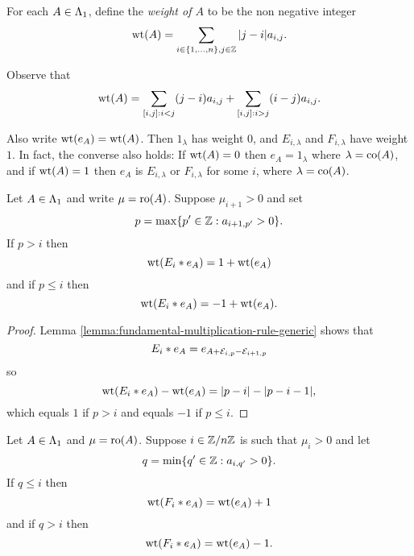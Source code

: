 \documentclass[a4paper, 11pt, twoside]{report}
\begin{document}
\begin{definition}\label{def:weight-of-matrix}
For each $A\in\Lambda_1{}$, define the \emph{weight of $A$} to be the non negative integer
\begin{equation*}
\operatorname{wt}(A) = \sum_{i\in\{1,\ldots,n\},j\in\mathbb{Z}} |j-i| a_{i,j}.
\end{equation*}
\end{definition}

Observe that
\begin{equation*}
\operatorname{wt}(A) = \sum_{[i,j]:i<j}(j-i)a_{i,j} + \sum_{[i,j]:i>j}(i-j)a_{i,j}.
\end{equation*}

Also write $\operatorname{wt}(e_A) = \operatorname{wt}(A)$. Then $1_\lambda$ has weight $0$, and $E_{i,\lambda}$ and $F_{i,\lambda}$ have weight $1$. In fact, the converse also holds: If $\operatorname{wt}(A)=0$ then $e_A=1_\lambda$ where $\lambda=\operatorname{co}(A)$, and if $\operatorname{wt}(A)=1$ then $e_A$ is $E_{i,\lambda}$ or $F_{i,\lambda}$ for some $i$, where $\lambda=\operatorname{co}(A)$.

\begin{lemma}\label{lemma:weight-change-E}
Let $A\in\Lambda_1{}$ and write $\mu=\operatorname{ro}(A)$. Suppose $\mu_{i+1}>0$ and set
\begin{equation*}
p=\max\{p'\in\mathbb{Z}: a_{i+1,p'}>0\}.
\end{equation*}
If $p>i$ then
\begin{equation*}
\operatorname{wt}(E_i\ast e_A)=1+\operatorname{wt}(e_A)
\end{equation*}
and if $p\le i$ then
\begin{equation*}
\operatorname{wt}(E_i\ast e_A)=-1+\operatorname{wt}(e_A).
\end{equation*}
\end{lemma}

\begin{proof}
Lemma \ref{lemma:fundamental-multiplication-rule-generic} shows that
\begin{equation*}
E_i\ast e_A = e_{A+\mathcal{E}_{i,p}-\mathcal{E}_{i+1,p}}
\end{equation*}
so
\begin{equation*}
\operatorname{wt}(E_i\ast e_A) - \operatorname{wt}(e_A) = |p-i| - |p-i-1|,
\end{equation*}
which equals $1$ if $p>i$ and equals $-1$ if $p\le i$.
\end{proof}

\begin{lemma}\label{lemma:weight-change-F}
Let $A\in\Lambda_1{}$ and $\mu=\operatorname{ro}(A)$. Suppose $i\in\mathbb{Z}/{n \mathbb{Z}}$ is such that $\mu_i>0$ and let
\begin{equation*}
q = \min\{q'\in\mathbb{Z}:a_{i,q'}>0\}.
\end{equation*}
If $q\le i$ then
\begin{equation*}
\operatorname{wt}(F_i\ast e_A) = \operatorname{wt}(e_A) + 1
\end{equation*}
and if $q>i$ then
\begin{equation*}
\operatorname{wt}(F_i\ast e_A) = \operatorname{wt}(e_A) - 1.
\end{equation*}
\end{lemma}
\end{document}
